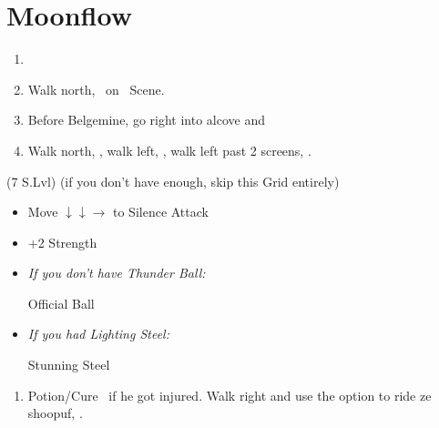 \chapter{Moonflow}

\begin{enumerate}
    \item \formation{\tidus}{\kimahri}{\auron}
    \item Walk north, \sd\ on \kimahri\ Scene.
    \item Before Belgemine, go right into alcove and 
    \item Walk north, \sd, walk left, \sd, walk left past 2 screens, \sd.
\end{enumerate}
\begin{spheregrid}
    \begin{itemize}
        \wakkaf (7 S.Lvl) (if you don't have enough, skip this Grid entirely)
        \begin{itemize}
            \item Move $\downarrow\downarrow\rightarrow$ to Silence Attack
            \item +2 Strength
        \end{itemize}
    \end{itemize}
\end{spheregrid}
\begin{equip}
    \begin{itemize}
        \item \textit{If you don't have Thunder Ball:}
        \begin{itemize}
            \wakkaf Official Ball
        \end{itemize}
        \item \textit{If you had Lighting Steel:}
        \begin{itemize}
            \tidusf Stunning Steel
        \end{itemize}
    \end{itemize}
\end{equip}
\begin{enumerate}[resume]
    \item Potion/Cure \tidus\ if he got injured. Walk right and use the  option to ride ze shoopuf, \sd.
\end{enumerate}
